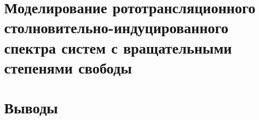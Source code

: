 \documentclass[12pt, a4paper, oneside]{extbook}
\begin{document}
\chapter{Моделирование рототрансляционного столновительно-индуцированного спектра систем с вращательными степенями свободы}


\chapter{Выводы}

%



\end{document}

